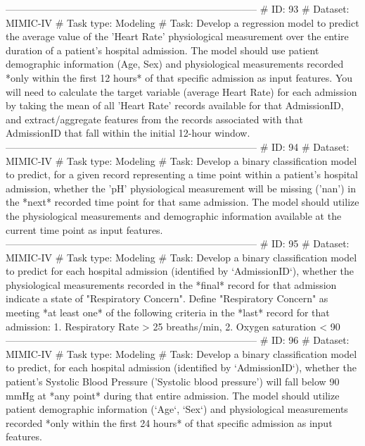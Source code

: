 \begin{tcolorbox}[colback=cadmiumgreen!5!white,colframe=forestgreen!75!white,breakable,title=\textit{Generated analytical tasks in task 4.}]
\begin{VerbatimWrap}
-----------------------------------------------------------------------------
# ID: 93  
# Dataset: MIMIC-IV 
# Task type: Modeling
# Task: Develop a regression model to predict the average value of the 'Heart Rate' physiological measurement over the entire duration of a patient's hospital admission. The model should use patient demographic information (Age, Sex) and physiological measurements recorded *only within the first 12 hours* of that specific admission as input features. You will need to calculate the target variable (average Heart Rate) for each admission by taking the mean of all 'Heart Rate' records available for that AdmissionID, and extract/aggregate features from the records associated with that AdmissionID that fall within the initial 12-hour window.
-----------------------------------------------------------------------------
# ID: 94  
# Dataset: MIMIC-IV 
# Task type: Modeling
# Task: Develop a binary classification model to predict, for a given record representing a time point within a patient's hospital admission, whether the 'pH' physiological measurement will be missing ('nan') in the *next* recorded time point for that same admission. The model should utilize the physiological measurements and demographic information available at the current time point as input features.
-----------------------------------------------------------------------------
# ID: 95  
# Dataset: MIMIC-IV 
# Task type: Modeling
# Task: Develop a binary classification model to predict for each hospital admission (identified by `AdmissionID`), whether the physiological measurements recorded in the *final* record for that admission indicate a state of "Respiratory Concern". Define "Respiratory Concern" as meeting *at least one* of the following criteria in the *last* record for that admission: 1. Respiratory Rate > 25 breaths/min, 2. Oxygen saturation < 90%
-----------------------------------------------------------------------------
# ID: 96  
# Dataset: MIMIC-IV 
# Task type: Modeling
# Task: Develop a binary classification model to predict, for each hospital admission (identified by `AdmissionID`), whether the patient's Systolic Blood Pressure ('Systolic blood pressure') will fall below 90 mmHg at *any point* during that entire admission. The model should utilize patient demographic information (`Age`, `Sex`) and physiological measurements recorded *only within the first 24 hours* of that specific admission as input features.

\end{VerbatimWrap}
\end{tcolorbox}
